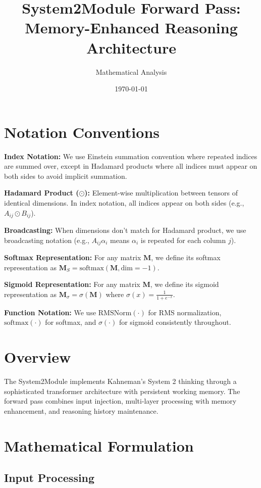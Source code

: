 \documentclass{article}
\title{System2Module Forward Pass: Memory-Enhanced Reasoning Architecture}
\author{Mathematical Analysis}
\date{\today}
\begin{document}
\maketitle

\section{Notation Conventions}

\textbf{Index Notation:} We use Einstein summation convention where repeated indices are summed over, except in Hadamard products where all indices must appear on both sides to avoid implicit summation.

\textbf{Hadamard Product ($\odot$):} Element-wise multiplication between tensors of identical dimensions. In index notation, all indices appear on both sides (e.g., $A_{ij} \odot B_{ij}$).

\textbf{Broadcasting:} When dimensions don't match for Hadamard product, we use broadcasting notation (e.g., $A_{ij} \alpha_i$ means $\alpha_i$ is repeated for each column $j$).

\textbf{Softmax Representation:} For any matrix $\mathbf{M}$, we define its softmax representation as $\mathbf{M}_S = \text{softmax}(\mathbf{M}, \text{dim}=-1)$.

\textbf{Sigmoid Representation:} For any matrix $\mathbf{M}$, we define its sigmoid representation as $\mathbf{M}_\sigma = \sigma(\mathbf{M})$ where $\sigma(x) = \frac{1}{1 + e^{-x}}$.

\textbf{Function Notation:} We use $\text{RMSNorm}(\cdot)$ for RMS normalization, $\text{softmax}(\cdot)$ for softmax, and $\sigma(\cdot)$ for sigmoid consistently throughout.

\section{Overview}

The System2Module implements Kahneman's System 2 thinking through a sophisticated transformer architecture with persistent working memory. The forward pass combines input injection, multi-layer processing with memory enhancement, and reasoning history maintenance.

\section{Mathematical Formulation}

\subsection{Input Processing}
\end{document}
